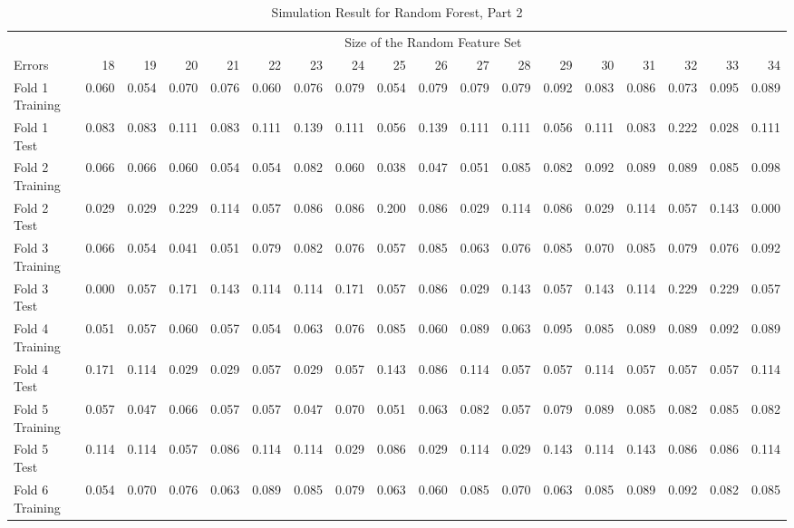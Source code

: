 \documentclass[12pt,oneside,a4paper]{article}
\begin{document}
\begin{landscape}
\begin{table}[ht]
\centering
\caption{Simulation Result for Random Forest, Part 2}
\begin{tabular}{lrrrrrrrrrrrrrrrrr}
  \toprule
 & \multicolumn{17}{c}{Size of the Random Feature Set}\\
 \cmidrule[0.05em]{2-18}
Errors & 18 & 19 & 20 & 21 & 22 & 23 & 24 & 25 & 26 & 27 & 28 & 29 & 30 & 31 & 32 & 33 & 34 \\
  \midrule
Fold 1 Training & 0.060 & 0.054 & 0.070 & 0.076 & 0.060 & 0.076 & 0.079 & 0.054 & 0.079 & 0.079 & 0.079 & 0.092 & 0.083 & 0.086 & 0.073 & 0.095 & 0.089 \\
  Fold 1 Test & 0.083 & 0.083 & 0.111 & 0.083 & 0.111 & 0.139 & 0.111 & 0.056 & 0.139 & 0.111 & 0.111 & 0.056 & 0.111 & 0.083 & 0.222 & 0.028 & 0.111 \\
  Fold 2 Training & 0.066 & 0.066 & 0.060 & 0.054 & 0.054 & 0.082 & 0.060 & 0.038 & 0.047 & 0.051 & 0.085 & 0.082 & 0.092 & 0.089 & 0.089 & 0.085 & 0.098 \\
  Fold 2 Test & 0.029 & 0.029 & 0.229 & 0.114 & 0.057 & 0.086 & 0.086 & 0.200 & 0.086 & 0.029 & 0.114 & 0.086 & 0.029 & 0.114 & 0.057 & 0.143 & 0.000 \\
  Fold 3 Training & 0.066 & 0.054 & 0.041 & 0.051 & 0.079 & 0.082 & 0.076 & 0.057 & 0.085 & 0.063 & 0.076 & 0.085 & 0.070 & 0.085 & 0.079 & 0.076 & 0.092 \\
  Fold 3 Test & 0.000 & 0.057 & 0.171 & 0.143 & 0.114 & 0.114 & 0.171 & 0.057 & 0.086 & 0.029 & 0.143 & 0.057 & 0.143 & 0.114 & 0.229 & 0.229 & 0.057 \\
  Fold 4 Training & 0.051 & 0.057 & 0.060 & 0.057 & 0.054 & 0.063 & 0.076 & 0.085 & 0.060 & 0.089 & 0.063 & 0.095 & 0.085 & 0.089 & 0.089 & 0.092 & 0.089 \\
  Fold 4 Test & 0.171 & 0.114 & 0.029 & 0.029 & 0.057 & 0.029 & 0.057 & 0.143 & 0.086 & 0.114 & 0.057 & 0.057 & 0.114 & 0.057 & 0.057 & 0.057 & 0.114 \\
  Fold 5 Training & 0.057 & 0.047 & 0.066 & 0.057 & 0.057 & 0.047 & 0.070 & 0.051 & 0.063 & 0.082 & 0.057 & 0.079 & 0.089 & 0.085 & 0.082 & 0.085 & 0.082 \\
  Fold 5 Test & 0.114 & 0.114 & 0.057 & 0.086 & 0.114 & 0.114 & 0.029 & 0.086 & 0.029 & 0.114 & 0.029 & 0.143 & 0.114 & 0.143 & 0.086 & 0.086 & 0.114 \\
  Fold 6 Training & 0.054 & 0.070 & 0.076 & 0.063 & 0.089 & 0.085 & 0.079 & 0.063 & 0.060 & 0.085 & 0.070 & 0.063 & 0.085 & 0.089 & 0.092 & 0.082 & 0.085 \\

\end{tabular}
\end{table}
\end{landscape}
\end{document}
